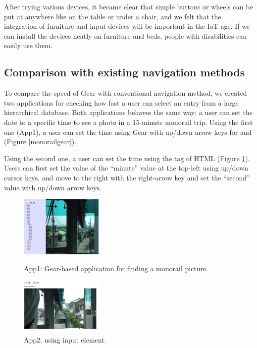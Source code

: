 \documentclass[conference]{IEEEtran}
\def\up{\tsf{▲}}
\def\down{\tsf{▼}}
\begin{document}
After trying various devices, it became clear that simple buttons or
wheels can be put at anywhere like on the table or under a chair, and
we felt that the integration of furniture and input devices will be
important in the IoT age\cite{10.1145/2494091.2497326}.
%
If we can install the devices neatly on furniture and beds,
people with disabilities can easily use them.

\subsection{Comparison with existing navigation methods}

To compare the speed of Gear with conventional navigation method,
we created two applications for checking how fast a user can select an entry
from a large hierarchical database.
%
Both applications behaves the same way:
a user can set the date to a specific time to see a photo in a 15-minute monorail trip.
%
Using the first one (App1), a user can set the time using Gear
with up/down arrow keys for {\up} and {\down} (Figure \ref{monorailgear}).

Using the second one, a user can set the time using the  tag of HTML (Figure \ref{monorailinput}).
Users can first set the value of the ``minute'' value at the top-left using up/down cursor keys,
and move to the right with the right-arrow key and set the ``second'' value with up/down arrow keys.

\begin{figure}[H]
  \begin{minipage}{0.49\hsize}
    \centerline{\includegraphics[width=40mm,bb=0 0 1624 1193]{figures/75007628f75ef1038bd5737e10a728b7.png}}
    \caption{App1: Gear-based application for finding a monorail picture.}
    \label{monorailgear}
  \end{minipage}
  \begin{minipage}{0.49\hsize}
    \centerline{\includegraphics[width=40mm,bb=0 0 1596 1116]{figures/325208a6d94c68e4f08e61a67df419c4.png}}
    \caption{App2: using input element.}
    \label{monorailinput}
  \end{minipage}
\end{figure}
\end{document}
